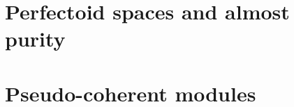     \begin{appendices}
        \chapter{Perfectoid spaces and almost purity}
            \begin{abstract}
                
            \end{abstract}
            
            \minitoc
            
            
            
            
            
            
            
        \chapter{Pseudo-coherent modules}
            \begin{abstract}
                
            \end{abstract}
            
            \minitoc
    \end{appendices}
	
	\printbibliography

